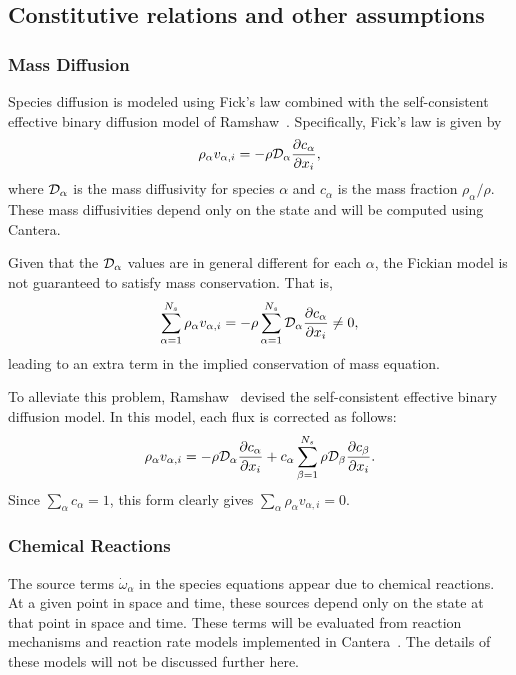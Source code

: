 \subsection{Constitutive relations and other assumptions}
\label{sec:constitutive}

\subsubsection{Mass Diffusion}
Species diffusion is modeled using Fick's law combined with the
self-consistent effective binary diffusion model of Ramshaw~\cite{?}.
Specifically, Fick's law is given by
%
\begin{equation*}
\rho_{\alpha} v_{\alpha, i} = - \rho \mathcal{D}_{\alpha} \frac{\partial c_{\alpha}}{\partial x_i},
\end{equation*}
% 
where $\mathcal{D}_{\alpha}$ is the mass diffusivity for species
$\alpha$ and $c_{\alpha}$ is the mass fraction $\rho_{\alpha} / \rho$.
These mass diffusivities depend only on the state and will be computed
using Cantera.

Given that the $\mathcal{D}_{\alpha}$ values are in general different for
each $\alpha$, the Fickian model is not guaranteed to satisfy mass
conservation.  That is,
%
\begin{equation*}
\sum_{\alpha = 1}^{N_s} \rho_{\alpha} v_{\alpha, i} = - \rho \sum_{\alpha = 1}^{N_s} \mathcal{D}_{\alpha} \frac{\partial c_{\alpha}}{\partial x_i} \neq 0,
\end{equation*}
% 
leading to an extra term in the implied conservation of mass
equation.

To alleviate this problem, Ramshaw~\cite{?} devised the self-consistent
effective binary diffusion model.  In this model, each flux is
corrected as follows:
%
\begin{equation*}
\rho_{\alpha} v_{\alpha, i} = - \rho \mathcal{D}_{\alpha} \frac{\partial c_{\alpha}}{\partial x_i} + c_{\alpha} \sum_{\beta = 1}^{N_s} \rho \mathcal{D}_{\beta} \frac{\partial c_{\beta}}{\partial x_i}.
\end{equation*}
% 
Since $\sum_{\alpha} c_{\alpha} = 1$, this form clearly gives
$\sum_{\alpha} \rho_{\alpha} v_{\alpha,i} = 0$.

\subsubsection{Chemical Reactions}
The source terms $\dot{\omega}_{\alpha}$ in the species equations
appear due to chemical reactions.  At a given point in space and time,
these sources depend only on the state at that point in space and
time.  These terms will be evaluated from reaction mechanisms and
reaction rate models implemented in Cantera~\cite{?}.  The details of
these models will not be discussed further here.

